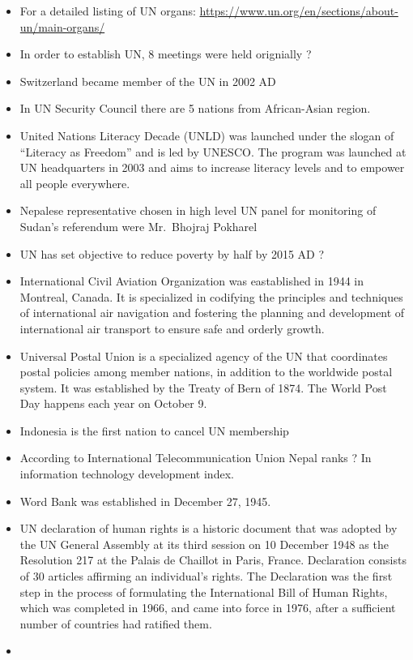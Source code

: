 \documentclass[
  openany]{book}
\begin{document}
\begin{itemize}
\item
  For a detailed listing of UN organs: \url{https://www.un.org/en/sections/about-un/main-organs/}
\item
  In order to establish UN, 8 meetings were held orignially ?
\item
  Switzerland became member of the UN in 2002 AD
\item
  In UN Security Council there are 5 nations from African-Asian region.
\item
  United Nations Literacy Decade (UNLD) was launched under the slogan of ``Literacy as Freedom'' and is led by UNESCO. The program was launched at UN headquarters in 2003 and aims to increase literacy levels and to empower all people everywhere.
\item
  Nepalese representative chosen in high level UN panel for monitoring of Sudan's referendum were Mr.~Bhojraj Pokharel
\item
  UN has set objective to reduce poverty by half by 2015 AD ?
\item
  International Civil Aviation Organization was eastablished in 1944 in Montreal, Canada. It is specialized in codifying the principles and techniques of international air navigation and fostering the planning and development of international air transport to ensure safe and orderly growth.
\item
  Universal Postal Union is a specialized agency of the UN that coordinates postal policies among member nations, in addition to the worldwide postal system. It was established by the Treaty of Bern of 1874. The World Post Day happens each year on October 9.
\item
  Indonesia is the first nation to cancel UN membership
\item
  According to International Telecommunication Union Nepal ranks ? In information technology development index.
\item
  Word Bank was established in December 27, 1945.
\item
  UN declaration of human rights is a historic document that was adopted by the UN General Assembly at its third session on 10 December 1948 as the Resolution 217 at the Palais de Chaillot in Paris, France. Declaration consists of 30 articles affirming an individual's rights. The Declaration was the first step in the process of formulating the International Bill of Human Rights, which was completed in 1966, and came into force in 1976, after a sufficient number of countries had ratified them.
\item

\end{itemize}
\end{document}
